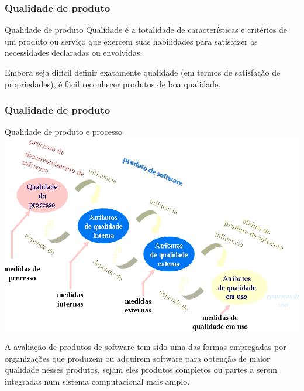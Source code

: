 \begin{frame}[parent={ie:agenda}, hasnext=false, hasprev=false]
	\frametitle{Qualidade de produto}
	
	\begin{block:concept}{Qualidade de produto}
		Qualidade é a totalidade de características e critérios de um produto ou
		serviço que exercem suas habilidades para satisfazer as necessidades 
		declaradas ou envolvidas.
	\end{block:concept}
	
	\begin{block:fact}{}
		Embora seja difícil definir exatamente qualidade (em termos de satisfação
		de propriedades), é fácil reconhecer produtos de boa qualidade.
	\end{block:fact}
\end{frame}


\begin{frame}[hasnext=true, hasprev=true]
	\frametitle{Qualidade de produto}
	
	\begin{block:fact}{Qualidade de produto e processo}
		\centering
		\includegraphics[width=\textwidth]{software-engineering/project-management/product/product-quality}
	\end{block:fact}
	
	\begin{block:fact}{}
		A avaliação de produtos de software tem sido uma das formas empregadas por
		organizações que produzem ou adquirem software para obtenção de maior
		qualidade nesses produtos, sejam eles produtos completos ou partes a serem
		integradas num sistema computacional mais amplo.
	\end{block:fact}
\end{frame}



